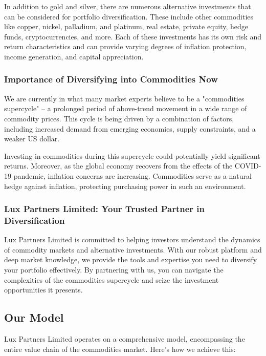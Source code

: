 \documentclass[11pt]{article}
\begin{document}
In addition to gold and silver, there are numerous alternative investments that can be considered for portfolio diversification. These include other commodities like copper, nickel, palladium, and platinum, real estate, private equity, hedge funds, cryptocurrencies, and more. Each of these investments has its own risk and return characteristics and can provide varying degrees of inflation protection, income generation, and capital appreciation.


\subsubsection{Importance of Diversifying into Commodities Now}

We are currently in what many market experts believe to be a "commodities supercycle" -- a prolonged period of above-trend movement in a wide range of commodity prices. This cycle is being driven by a combination of factors, including increased demand from emerging economies, supply constraints, and a weaker US dollar.


Investing in commodities during this supercycle could potentially yield significant returns. Moreover, as the global economy recovers from the effects of the COVID-19 pandemic, inflation concerns are increasing. Commodities serve as a natural hedge against inflation, protecting purchasing power in such an environment.


\subsubsection{Lux Partners Limited: Your Trusted Partner in Diversification}

Lux Partners Limited is committed to helping investors understand the dynamics of commodity markets and alternative investments. With our robust platform and deep market knowledge, we provide the tools and expertise you need to diversify your portfolio effectively. By partnering with us, you can navigate the complexities of the commodities supercycle and seize the investment opportunities it presents.


\subsection{Our Model}

Lux Partners Limited operates on a comprehensive model, encompassing the entire value chain of the commodities market. Here's how we achieve this:
\end{document}

